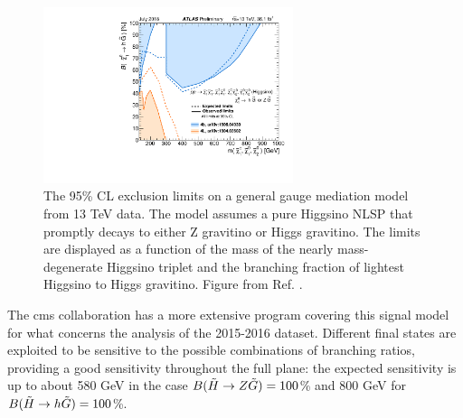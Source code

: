 \begin{figure}[htbp]
	\centering
	\includegraphics[width=0.65\textwidth]{figures/summary_plots/ATLAS_SUSY_EWSummary_GGM.pdf}
	\caption{The 95\% CL exclusion limits on a general gauge mediation model from 13 TeV data. 
	The model assumes a pure Higgsino NLSP that promptly decays to either Z gravitino or Higgs gravitino. 
	The limits are displayed as a function of the mass of the nearly mass-degenerate Higgsino triplet and the branching fraction of lightest Higgsino to Higgs gravitino. 	Figure from Ref. \cite{atlasSUSYSummary}.
	} 
	\label{fig:summary_atlas_higgsino_GMSB}
\end{figure}

The \gls{cms} collaboration has a more extensive program covering this signal model for what concerns the analysis of the 
2015-2016 dataset. 
Different final states are exploited to be sensitive to the possible combinations of branching ratios, 
providing a good sensitivity throughout the full plane: 
the expected sensitivity is up to about 580 GeV in the case $B(\tilde{H}\rightarrow Z \tilde{G})=100$\% and 800 GeV for 
$B(\tilde{H}\rightarrow h \tilde{G})=100$\%.


